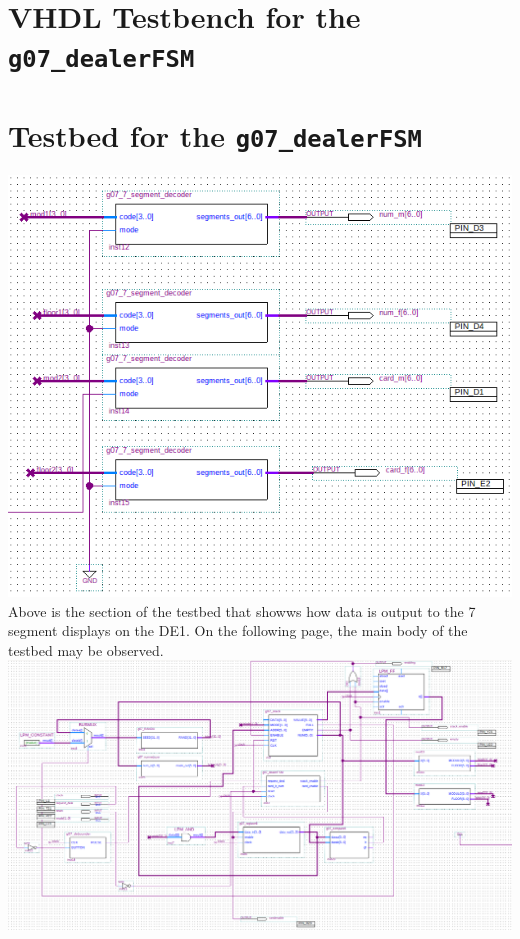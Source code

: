 \documentclass[12pt]{report}
\begin{document}
\begin{appendix}
	\chapter{VHDL Testbench for the \texttt{g07\_dealerFSM}}
	\label{a:dealertst}
	
	\chapter{Testbed for the \texttt{g07\_dealerFSM}}
	\label{a:testbed}
	\includegraphics[scale=0.8,angle=0]{testbed_led}\\
	Above is the section of the testbed that showws how data is output to the 7 segment displays on
	the DE1. On the following page, the main body of the testbed may be observed.
	\includegraphics[scale=0.5,angle=270]{testbed_body}
\end{appendix}
\end{document}
